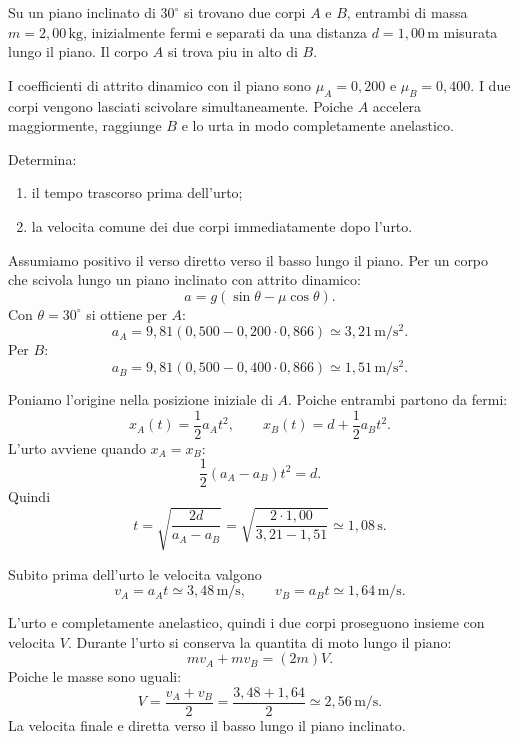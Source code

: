 
\begin{esercizio}
Su un piano inclinato di \(30^\circ\) si trovano due corpi \(A\) e \(B\),
entrambi di massa \(m=2{,}00\,\mathrm{kg}\), inizialmente fermi e separati da
una distanza \(d=1{,}00\,\mathrm{m}\) misurata lungo il piano. Il corpo \(A\)
si trova piu in alto di \(B\).

I coefficienti di attrito dinamico con il piano sono
\(\mu_A=0{,}200\) e \(\mu_B=0{,}400\). I due corpi vengono lasciati scivolare
simultaneamente. Poiche \(A\) accelera maggiormente, raggiunge \(B\) e lo urta
in modo completamente anelastico.

Determina:
\begin{enumerate}
\item il tempo trascorso prima dell'urto;
\item la velocita comune dei due corpi immediatamente dopo l'urto.
\end{enumerate}
\end{esercizio}

\begin{soluzione}
Assumiamo positivo il verso diretto verso il basso lungo il piano. Per un corpo
che scivola lungo un piano inclinato con attrito dinamico:
\[
a=g(\sin\theta-\mu\cos\theta).
\]
Con \(\theta=30^\circ\) si ottiene per \(A\):
\[
a_A=9{,}81\left(0{,}500-0{,}200\cdot0{,}866\right)
\simeq3{,}21\,\mathrm{m/s^2}.
\]
Per \(B\):
\[
a_B=9{,}81\left(0{,}500-0{,}400\cdot0{,}866\right)
\simeq1{,}51\,\mathrm{m/s^2}.
\]

Poniamo l'origine nella posizione iniziale di \(A\). Poiche entrambi partono da
fermi:
\[
x_A(t)=\frac12a_At^2,
\qquad
x_B(t)=d+\frac12a_Bt^2.
\]
L'urto avviene quando \(x_A=x_B\):
\[
\frac12(a_A-a_B)t^2=d.
\]
Quindi
\[
t=\sqrt{\frac{2d}{a_A-a_B}}
=\sqrt{\frac{2\cdot1{,}00}{3{,}21-1{,}51}}
\simeq1{,}08\,\mathrm{s}.
\]

Subito prima dell'urto le velocita valgono
\[
v_A=a_At\simeq3{,}48\,\mathrm{m/s},
\qquad
v_B=a_Bt\simeq1{,}64\,\mathrm{m/s}.
\]

L'urto e completamente anelastico, quindi i due corpi proseguono insieme con
velocita \(V\). Durante l'urto si conserva la quantita di moto lungo il piano:
\[
mv_A+mv_B=(2m)V.
\]
Poiche le masse sono uguali:
\[
V=\frac{v_A+v_B}{2}
=\frac{3{,}48+1{,}64}{2}
\simeq2{,}56\,\mathrm{m/s}.
\]
La velocita finale e diretta verso il basso lungo il piano inclinato.
\end{soluzione}
